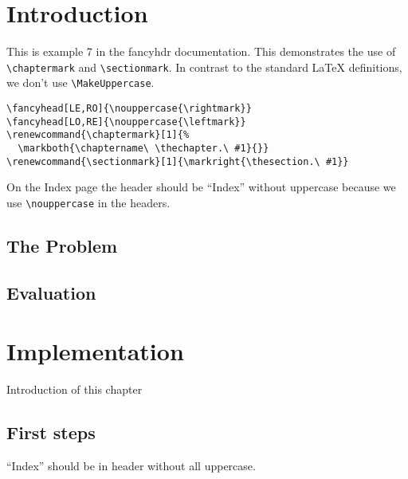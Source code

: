 \documentclass{book}
\renewcommand{\chaptermark}[1]{%
  \markboth{\chaptername\ \thechapter.\ #1}{}}
\renewcommand{\sectionmark}[1]{\markright{\thesection.\ #1}}
\begin{document}
\chapter{Introduction}

\begin{boxedminipage}{\textwidth}
This is example 7 in the fancyhdr documentation. 
This demonstrates the use of \verb|\chaptermark| and \verb|\sectionmark|. In contrast to the standard \LaTeX{} definitions, we don't use \verb|\MakeUppercase|.
\begin{verbatim}
\fancyhead[LE,RO]{\nouppercase{\rightmark}}
\fancyhead[LO,RE]{\nouppercase{\leftmark}}
\renewcommand{\chaptermark}[1]{%
  \markboth{\chaptername\ \thechapter.\ #1}{}}
\renewcommand{\sectionmark}[1]{\markright{\thesection.\ #1}}
\end{verbatim}
On the Index page the header should be ``Index'' without uppercase because we use \verb|\nouppercase| in the headers.
\end{boxedminipage}

\section{The Problem}
\label{sec:problem}

\lipsum[1]

\section{Evaluation}

\lipsum[2]

\chapter{Implementation}

Introduction of this chapter

\lipsum[3]

\section{First steps}
\label{sec:first-steps}

\lipsum
\printindex
\newpage
``Index'' should be in header without all uppercase.
\end{document}
